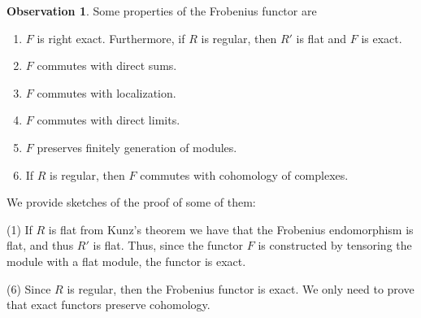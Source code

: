 \documentclass[leqno]{article}
\theoremstyle{definition}
\newtheorem{observation}{Observation}[section]
\begin{document}
\begin{observation} Some properties of the Frobenius functor are
\begin{enumerate}[topsep=-6pt, itemsep=0pt]
  \item $F$ is right exact. Furthermore, if $R$ is regular, then $R'$ is flat and  $F$ is exact.
  \item $F$ commutes with direct sums.
  \item $F$ commutes with localization.
  \item $F$ commutes with direct limits. 
  \item $F$ preserves finitely generation of modules.
  \item If $R$ is regular, then $F$ commutes with cohomology of complexes.
\end{enumerate}
We provide sketches of the proof of some of them:

(1) If $R$ is flat from Kunz's theorem we have that the Frobenius endomorphism is flat, and thus $R'$ is flat. Thus, since the functor  $F$ is constructed by tensoring the module with a flat module, the functor is exact.

(6) Since $R$ is regular, then the Frobenius functor is exact. We only need to prove that exact functors preserve cohomology.


\end{observation}
\end{document}
